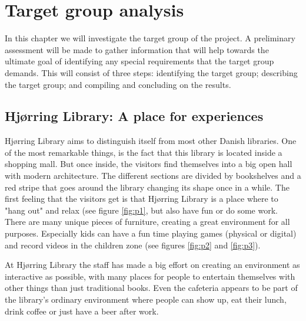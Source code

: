 \chapter{Target group analysis}
In this chapter we will investigate the target group of the project. A preliminary assessment will be made to gather information that will help towards the ultimate goal of identifying any special requirements that the target group demands. This will consist of three steps: identifying the target group; describing the target group; and compiling and concluding on the results.

\section{Hj{\o}rring Library: A place for experiences}\label{hjoerring}

Hj{\o}rring Library aims to distinguish itself from most other Danish libraries. One of the most remarkable things, is the fact that this library is located inside a shopping mall. But once inside, the visitors find themselves into a big open hall with modern architecture. The different sections are divided by bookshelves and a red stripe that goes around the library changing its shape once in a while. The first feeling that the visitors get is that Hj{\o}rring Library is a place where to "hang out" and relax (see figure \ref{fig:p1}, but also have fun or do some work. There are many unique pieces of furniture, creating a great environment for all purposes. Especially kids can have a fun time playing games (physical or digital) and record videos in the children zone (see figures \ref{fig:p2} and \ref{fig:p3}).

At Hj{\o}rring Library the staff has made a big effort on creating an environment as interactive as possible, with many places for people to entertain themselves with other things than just traditional books. Even the cafeteria appears to be part of the library's ordinary environment where people can show up, eat their lunch, drink coffee or just have a beer after work.

